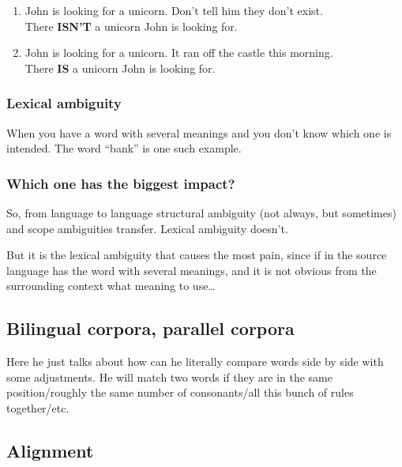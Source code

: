 \begin{enumerate}
	\item John is looking for a unicorn. Don't tell him they don't exist.\\
There \textbf{ISN'T} a unicorn John is looking for.
	\item John is looking for a unicorn. It ran off the castle this morning. \\
There \textbf{IS} a unicorn John is looking for.
\end{enumerate} 

\subsubsection{Lexical ambiguity}
When you have a word with several meanings and you don't know
which one is intended. The word ``bank'' is one such example.


\subsubsection{Which one has the biggest impact?}
So, from language to language structural ambiguity (not always, but sometimes)
and scope ambiguities transfer. Lexical ambiguity doesn't.

But it is the lexical ambiguity that causes the most pain, since if in the 
source language has the word with several meanings, and it is not obvious from 
the surrounding context what meaning to use\ldots 


\subsection{Bilingual corpora, parallel corpora} 

Here he just talks about how can he literally compare words side by side with
some adjustments. He will match two words if they are in the same
position/roughly the same number of consonants/all this bunch of rules
together/etc.


\subsection{Alignment} 

